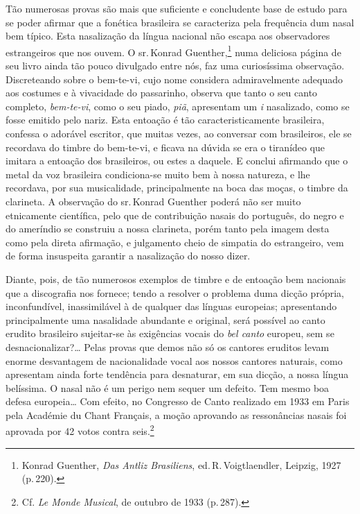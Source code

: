 Tão numerosas provas são mais que suficiente e concludente base de
estudo para se poder afirmar que a fonética brasileira se caracteriza
pela frequência dum nasal bem típico. Esta nasalização da língua
nacional não escapa aos observadores estrangeiros que nos ouvem. O sr.\,Konrad Guenther,\footnote{Konrad Guenther, \emph{Das Antliz Brasiliens}, ed.\,R.\,Voigtlaendler,
Leipzig, 1927 (p.\,220).} numa deliciosa página de seu livro ainda tão pouco
divulgado entre nós, faz uma curiosíssima observação. Discreteando sobre
o bem-te-vi, cujo nome considera admiravelmente adequado aos costumes e
à vivacidade do passarinho, observa que tanto o seu canto completo,
\textit{bem-te-vi}, como o seu piado, \textit{piã}, apresentam um \textit{i} nasalizado,
como se fosse emitido pelo nariz. Esta entoação é tão
caracteristicamente brasileira, confessa o adorável escritor, que muitas
vezes, ao conversar com brasileiros, ele se recordava do timbre do
bem-te-vi, e ficava na dúvida se era o tiranídeo que imitara a entoação
dos brasileiros, ou estes a daquele. E conclui afirmando que o metal da
voz brasileira condiciona-se muito bem à nossa natureza, e lhe
recordava, por sua musicalidade, principalmente na boca das moças, o
timbre da clarineta. A observação do sr.\,Konrad Guenther poderá não ser
muito etnicamente científica, pelo que de contribuição nasais do
português, do negro e do ameríndio se construiu a nossa clarineta, porém
tanto pela imagem desta como pela direta afirmação, e julgamento cheio
de simpatia do estrangeiro, vem de forma insuspeita garantir a
nasalização do nosso dizer.

Diante, pois, de tão numerosos exemplos de timbre e de entoação bem
nacionais que a discografia nos fornece; tendo a resolver o problema
duma dicção própria, inconfundível, inassimilável à de qualquer das
línguas europeias; apresentando principalmente uma nasalidade abundante
e original, será possível ao canto erudito brasileiro sujeitar-se às
exigências vocais do \textit{bel canto} europeu, sem se desnacionalizar?\ldots{}
Pelas provas que demos não só os cantores eruditos levam enorme
desvantagem de nacionalidade vocal aos nossos cantores naturais, como
apresentam ainda forte tendência para desnaturar, em sua dicção, a nossa
língua belíssima. O nasal não é um perigo nem sequer um defeito. Tem
mesmo boa defesa europeia\ldots{} Com efeito, no Congresso de Canto realizado
em 1933 em Paris pela Académie du Chant Français, a moção aprovando as
ressonâncias nasais foi aprovada por 42 votos contra seis.\footnote{Cf. \emph{Le Monde Musical}, de outubro de 1933 (p.\,287).}

